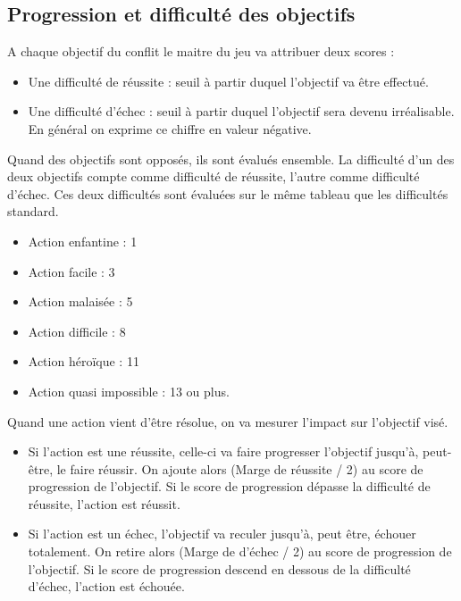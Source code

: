 
\begin{multicols}{2}

\subsection{Progression et difficulté des objectifs}

A chaque objectif du conflit le maitre du jeu va attribuer deux scores :
\begin{itemize}
\item Une difficulté de réussite : seuil à partir duquel l’objectif va être effectué.
\item Une difficulté d’échec : seuil à partir duquel l’objectif sera devenu irréalisable. En général on exprime ce chiffre en valeur négative.
\end{itemize}

Quand des objectifs sont opposés, ils sont évalués ensemble. La difficulté d’un des deux objectifs compte comme difficulté de réussite, l’autre comme difficulté d’échec.  Ces deux difficultés sont évaluées sur le même tableau que les difficultés standard.

\begin{itemize}
\item Action enfantine : 1
\item Action facile : 3
\item Action malaisée : 5
\item Action difficile : 8
\item Action héroïque : 11
\item Action quasi impossible : 13 ou plus.
\end{itemize}

Quand une action vient d’être résolue, on va mesurer l’impact sur l’objectif visé.
\begin{itemize}
\item Si l’action est une réussite,  celle-ci va faire progresser l’objectif jusqu’à, peut-être, le faire réussir. On ajoute alors (Marge de réussite / 2) au score de progression de l’objectif. Si le score de progression dépasse la difficulté de réussite, l’action est réussit.
\item Si l’action est un échec, l’objectif va reculer jusqu’à, peut être, échouer totalement. On retire alors (Marge de d’échec / 2) au score de progression de l’objectif. Si le score de progression descend en dessous de la difficulté d’échec, l’action est échouée.
\end{itemize}

\end{multicols}

